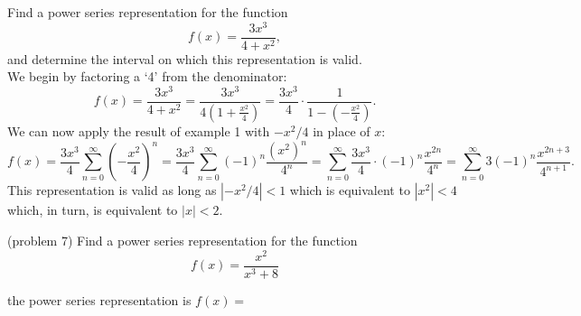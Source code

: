 \documentclass{ximera}
\begin{document}
\begin{example}[example 7]
Find a power series representation for the function
\[
f(x) = \frac{3x^3}{4 + x^2},
\]
and determine the interval on which this representation is valid.\\
We begin by factoring a `4' from the denominator:
\[
f(x) = \frac{3x^3}{4+x^2} = \frac{3x^3}{4(1 + \frac{x^2}{4})} = \frac{3x^3}{4} \cdot \frac{1}{1 - (-\frac{x^2}{4})}.
\]
We can now apply the result of example 1 with $-x^2 /4$ in place of $x$:
\[
f(x) = \frac{3x^3}{4} \sum_{n=0}^\infty \left(-\frac{x^2}{4}\right)^n = \frac{3x^3}{4} \sum_{n=0}^\infty (-1)^n \frac{(x^2)^n}{4^n}
=  \sum_{n=0}^\infty \frac{3x^3}{4} \cdot (-1)^n \frac{x^{2n}}{4^n} =  \sum_{n=0}^\infty 3 (-1)^n \frac{x^{2n+3}}{4^{n+1}}. 
\]
This representation is valid as long as $|-x^2/4| < 1$ which is equivalent to $|x^2| < 4$ which, in turn, is equivalent to $|x| < 2$.

\end{example}


\begin{problem}(problem 7)
Find a power series representation for the function
\[
f(x) = \frac{x^2}{x^3+8}
\]

the power series representation is $f(x) = $
\begin{multipleChoice}
\end{multipleChoice}
\end{problem}


\begin{center}
\begin{foldable}
\end{foldable}
\end{center}
\end{document}
